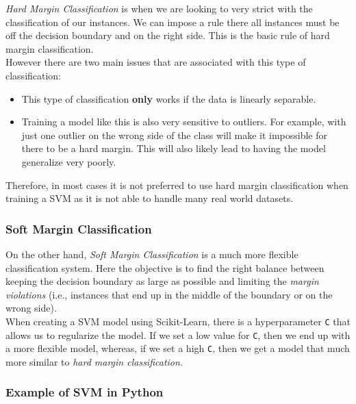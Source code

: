 \textit{Hard Margin Classification} is when we are looking to very strict with the classification of our instances.
We can impose a rule there all instances must be off the decision boundary and on the right side. This is the 
basic rule of hard margin classification. \\

\noindent
However there are two main issues that are associated with this type of classification:

\begin{itemize}
    \item This type of classification \textbf{only} works if the data is linearly separable.
    \item Training a model like this is also very sensitive to outliers. For example, with just one outlier 
    on the wrong side of the class will make it impossible for there to be a hard margin. This will also likely
    lead to having the model generalize very poorly.     
\end{itemize}

\noindent
Therefore, in most cases it is not preferred to use hard margin classification when training a SVM as it is not
able to handle many real world datasets.

\subsubsection{Soft Margin Classification}

On the other hand, \textit{Soft Margin Classification} is a much more flexible classification system. Here the 
objective is to find the right balance between keeping the decision boundary as large as possible and limiting the 
\textit{margin violations} (i.e., instances that end up in the middle of the boundary or on the wrong side). \\

\noindent
When creating a SVM model using Scikit-Learn, there is a hyperparameter \texttt{C} that allows us to 
regularize the model. If we set a low value for \texttt{C}, then we end up with a more flexible model,
whereas, if we set a high \texttt{C}, then we get a model that much more similar to 
\textit{hard margin classification}.

\subsubsection*{Example of SVM in Python}

